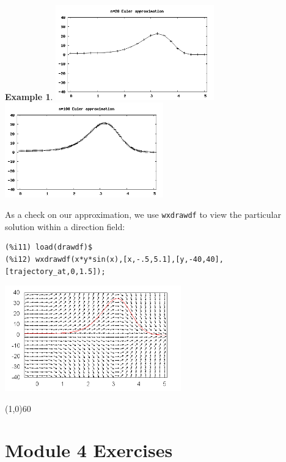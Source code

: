 \documentclass[10.5pt,twoside]{report}
\theoremstyle{definition}
\newtheorem{exmp}{Example}[section]
\begin{document}
\begin{exmp}
\includegraphics[width=2.7in]{example_4_5_2_3}
\includegraphics[width=2.7in]{example_4_5_2_4}

As a check on our approximation, we use \verb|wxdrawdf| to view the particular solution within a direction field:

\begin{verbatim}
(%i11) load(drawdf)$
(%i12) wxdrawdf(x*y*sin(x),[x,-.5,5.1],[y,-40,40],[trajectory_at,0,1.5]);
\end{verbatim}

\includegraphics[width=3in]{example_4_5_2_5}

\end{exmp}

\line(1,0){60}
\linethickness{0.5mm}
\pagebreak

\section{Module 4 Exercises}\label{Module 4 Exercises}
\end{document}
